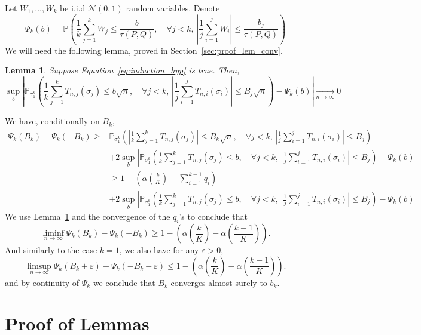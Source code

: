 \documentclass{article}
\theoremstyle{plain}
\newtheorem{Lemma}{Lemma}
\theoremstyle{remark}
\renewcommand{\P}{\mathbb{P}}
\newcommand{\1}{\mathbbm{1}}
\newcommand{\todoT}[1]{\todo[inline,color=blue!40]{{\textbf{T:}~}#1}}
\numberwithin{equation}{section}
\begin{document}
Let $W_1,\dots,W_k$ be i.i.d $\mathcal{N}(0,1)$ random variables. Denote
$$\Psi_k(b) = \P\left( \frac{1}{k}\sum_{j=1}^k W_j \le \frac{b}{\tau(P,Q)}, \quad \forall j<k,\, \left|\frac{1}{j}\sum_{i=1}^j W_i\right| \le \frac{b_j}{\tau(P,Q)} \right) $$
We will need the following lemma, proved in Section~\ref{sec:proof_lem_conv}.
\begin{Lemma}\label{lem:convergence_conditional}
Suppose Equation~\eqref{eq:induction_hyp} is true. Then,
$$\sup_{b}\left|\P_{\sigma_1^{k}}\left(\frac{1}{k}\sum_{j=1}^k T_{n,j}\left(\sigma_j\right)\le b \sqrt{n}, \quad \forall j < k,\,  \left|\frac{1}{j}\sum_{i=1}^j T_{n,i}\left(\sigma_i\right)\right|\le  B_j\sqrt{n} \right)-\Psi_k(b) \right|\xrightarrow[n \to \infty]{}0$$
\end{Lemma}
We have, conditionally on $B_k$,
\begin{align*}
\Psi_k(B_k)-\Psi_k(-B_k)\ge&  \P_{\sigma_1^{k}}\left(\left|\frac{1}{k}\sum_{j=1}^k T_{n,j}\left(\sigma_j\right)\right|\le B_k \sqrt{n}, \quad \forall j < k,\,  \left|\frac{1}{j}\sum_{i=1}^j T_{n,i}\left(\sigma_i\right)\right|\le  B_j \right)\\
&+ 2 \sup_{b}\left|\P_{\sigma_1^{k}}\left(\frac{1}{k}\sum_{j=1}^k T_{n,j}\left(\sigma_j\right)\le b , \quad \forall j < k,\,  \left|\frac{1}{j}\sum_{i=1}^j T_{n,i}\left(\sigma_i\right)\right|\le  B_j \right)-\Psi_k(b) \right|\\
&\ge 1-\left(\alpha\left( \frac{k}{K}\right)-\sum_{i=1}^{k-1}q_i\right) \\
&+ 2 \sup_{b}\left|\P_{\sigma_1^{k}}\left(\frac{1}{k}\sum_{j=1}^k T_{n,j}\left(\sigma_j\right)\le b , \quad \forall j < k,\,  \left|\frac{1}{j}\sum_{i=1}^j T_{n,i}\left(\sigma_i\right)\right|\le  B_j \right)-\Psi_k(b) \right|
\end{align*}
We use Lemma~\ref{lem:convergence_conditional} and the convergence of the $q_i$'s to conclude that
$$\liminf_{n \to \infty}\Psi_k(B_k)-\Psi_k(-B_k) \ge 1-\left(\alpha\left( \frac{k}{K}\right)-\alpha\left( \frac{k-1}{K}\right)\right).$$
And similarly to the case $k=1$, we also have for any $\varepsilon>0$,
$$\limsup_{n \to \infty}\Psi_k(B_k+\varepsilon)-\Psi_k(-B_k-\varepsilon) \le  1-\left(\alpha\left( \frac{k}{K}\right)-\alpha\left( \frac{k-1}{K}\right)\right).$$
and by continuity of $\Psi_k$ we conclude that $B_k$ converges almost surely to $b_k$.
\todoT{Check continuity of $\Psi_k$}
\section{Proof of Lemmas}
\end{document}
